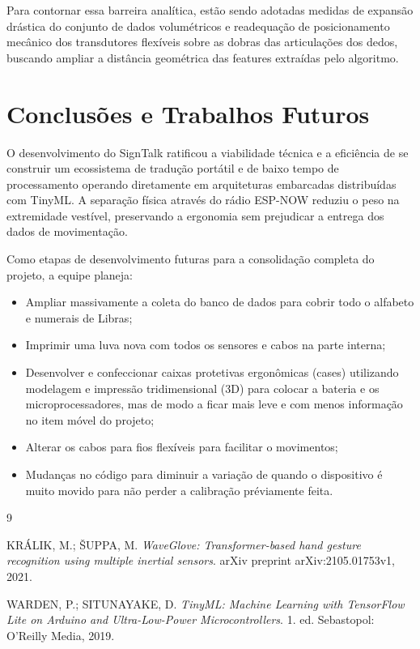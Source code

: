 \documentclass[12pt,a4paper]{article}
\begin{document}
Para contornar essa barreira analítica, estão sendo adotadas medidas de expansão drástica do conjunto de dados volumétricos e readequação de posicionamento mecânico dos transdutores flexíveis sobre as dobras das articulações dos dedos, buscando ampliar a distância geométrica das features extraídas pelo algoritmo.

\section{Conclusões e Trabalhos Futuros}

O desenvolvimento do SignTalk ratificou a viabilidade técnica e a eficiência de se construir um ecossistema de tradução portátil e de baixo tempo de processamento operando diretamente em arquiteturas embarcadas distribuídas com TinyML. A separação física através do rádio ESP-NOW reduziu o peso na extremidade vestível, preservando a ergonomia sem prejudicar a entrega dos dados de movimentação.

Como etapas de desenvolvimento futuras para a consolidação completa do projeto, a equipe planeja:
\begin{itemize}
    \item Ampliar massivamente a coleta do banco de dados para cobrir todo o alfabeto e numerais de Libras;
    \item Imprimir uma luva nova com todos os sensores e cabos na parte interna;
    \item Desenvolver e confeccionar caixas protetivas ergonômicas (cases) utilizando modelagem e impressão tridimensional (3D) para colocar a bateria e os microprocessadores, mas de modo a ficar mais leve e com menos informação no item móvel do projeto;
    \item Alterar os cabos para fios flexíveis para facilitar o movimentos;
    \item Mudanças no código para diminuir a variação de quando o dispositivo é muito movido para não perder a calibração préviamente feita.
\end{itemize}

\begin{thebibliography}{9}

KRÁLIK, M.; ŠUPPA, M.
\textit{WaveGlove: Transformer-based hand gesture recognition using multiple inertial sensors}.
arXiv preprint arXiv:2105.01753v1, 2021.

WARDEN, P.; SITUNAYAKE, D.
\textit{TinyML: Machine Learning with TensorFlow Lite on Arduino and Ultra-Low-Power Microcontrollers}.
1. ed. Sebastopol: O’Reilly Media, 2019.


\end{thebibliography}
\end{document}

